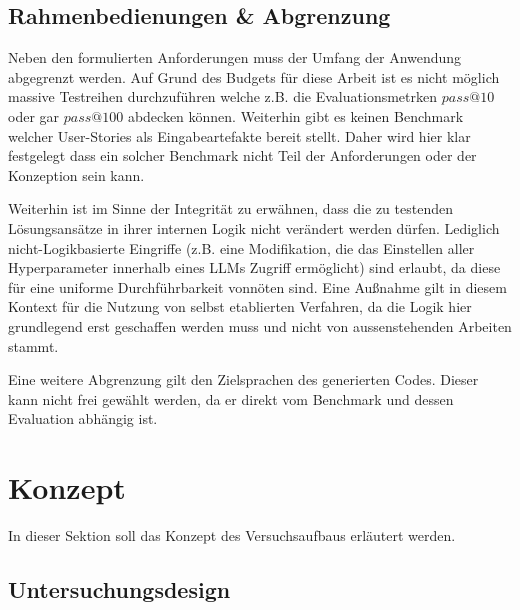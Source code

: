 \subsection{Rahmenbedienungen \& Abgrenzung}\label{ch:Rahmenbedienungen_Abgrenzung}


Neben den formulierten Anforderungen muss der Umfang der Anwendung abgegrenzt werden. Auf Grund des Budgets für diese Arbeit ist es nicht möglich massive Testreihen durchzuführen welche z.B. die Evaluationsmetrken $pass@10$ oder gar $pass@100$ abdecken können. Weiterhin gibt es keinen Benchmark welcher User-Stories als Eingabeartefakte bereit stellt. Daher wird hier klar festgelegt dass ein solcher Benchmark nicht Teil der Anforderungen oder der Konzeption sein kann.

Weiterhin ist im Sinne der Integrität zu erwähnen, dass die zu testenden Lösungsansätze in ihrer internen Logik nicht verändert werden dürfen. Lediglich nicht-Logikbasierte Eingriffe (z.B. eine Modifikation, die das Einstellen aller Hyperparameter innerhalb eines LLMs Zugriff ermöglicht) sind erlaubt, da diese für eine uniforme Durchführbarkeit vonnöten sind. Eine Außnahme gilt in diesem Kontext für die Nutzung von selbst etablierten Verfahren, da die Logik hier grundlegend erst geschaffen werden muss und nicht von aussenstehenden Arbeiten stammt.

Eine weitere Abgrenzung gilt den Zielsprachen des generierten Codes. Dieser kann nicht frei gewählt werden, da er direkt vom Benchmark und dessen Evaluation abhängig ist.

\section{Konzept}\label{ch:Konzept}

In dieser Sektion soll das Konzept des Versuchsaufbaus erläutert werden. 

\subsection{Untersuchungsdesign}\label{ch:Untersuchungsdesign}

